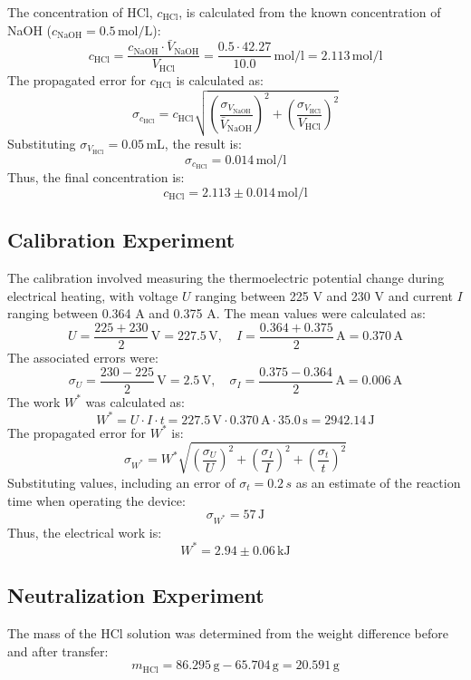 \documentclass[a4paper,12pt]{article}
\begin{document}
The concentration of HCl, \( c_{\text{HCl}} \), is calculated from the known concentration of NaOH (\( c_{\text{NaOH}} = 0.5 \, \text{mol/L} \)):
\[
c_{\text{HCl}} = \frac{c_{\text{NaOH}} \cdot \bar{V}_{\text{NaOH}}}{V_{\text{HCl}}} = \frac{0.5 \cdot 42.27}{10.0} \,\si{\mol\per\litre}= 2.113 \, \si{\mol\per\litre}
\]
The propagated error for \( c_{\text{HCl}} \) is calculated as:
\[
\sigma_{c_{\text{HCl}}} = c_{\text{HCl}} \sqrt{\left(\frac{\sigma_{V_{\text{NaOH}}}}{\bar{V}_{\text{NaOH}}}\right)^2 + \left(\frac{\sigma_{V_{\text{HCl}}}}{V_{\text{HCl}}}\right)^2}
\]
Substituting \( \sigma_{V_{\text{HCl}}} = 0.05 \, \text{mL} \), the result is:
\[
\sigma_{c_{\text{HCl}}} = 0.014 \, \si{\mol\per\litre}
\]
Thus, the final concentration is:
\[
c_{\text{HCl}} = 2.113 \pm 0.014 \, \si{\mol\per\litre}
\]

\subsection{Calibration Experiment}
The calibration involved measuring the thermoelectric potential change during electrical heating, with voltage \( U \) ranging between 225 V and 230 V and current \( I \) ranging between 0.364 A and 0.375 A. The mean values were calculated as:
\[
U = \frac{225 + 230}{2} \,\text{V} = 227.5 \, \text{V}, \quad I = \frac{0.364 + 0.375}{2} \,\text{A}= 0.370 \, \text{A}
\]
The associated errors were:
\[
\sigma_U = \frac{230 - 225}{2} \,\si{\volt}= 2.5 \, \text{V}, \quad \sigma_I = \frac{0.375 - 0.364}{2} \,\si{\ampere}= 0.006 \, \text{A}
\]
The work \( W^* \) was calculated as:
\[
W^* = U \cdot I \cdot t = 227.5 \,\text{V}\cdot 0.370 \,\text{A}\cdot 35.0 \,\text{s}= 2942.14 \, \text{J}
\]
The propagated error for \( W^* \) is:
\[
\sigma_{W^*} = W^* \sqrt{\left(\frac{\sigma_U}{U}\right)^2 + \left(\frac{\sigma_I}{I}\right)^2 + \left(\frac{\sigma_t}{t}\right)^2}
\]
Substituting values, including an error of \( \sigma_t = 0.2 \, s \) as an estimate of the reaction time when operating the device:
\[
\sigma_{W^*} = 57 \, \text{J}
\]
Thus, the electrical work is:
\[
W^* = 2.94 \pm 0.06 \, \text{kJ}
\]

\subsection{Neutralization Experiment}
The mass of the HCl solution was determined from the weight difference before and after transfer:
\[
m_{\text{HCl}} = 86.295 \, \text{g} - 65.704 \, \text{g} = 20.591 \, \text{g}
\]
\end{document}
